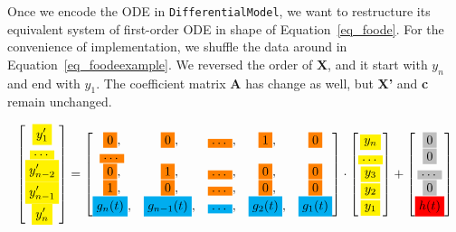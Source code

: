 Once we encode the ODE in \verb|DifferentialModel|, we want to restructure its equivalent system of first-order ODE in shape of Equation~\ref{eq_foode}. For the convenience of implementation, we shuffle the data around in Equation~\ref{eq_foodeexample}. We reversed the order of \textbf{X}, and it start with $y_{n}$ and end with $y_{1}$. The coefficient matrix \textbf{A} has change as well, but \textbf{X'} and \textbf{c} remain unchanged.



\begin{equation} \label{eq_foodeexamplecolor}
	\begin{bmatrix}
		\highlight{yellow}{y_{1}'} \\
    \highlight{yellow}{\dots} \\
    \highlight{yellow}{y_{n-2}'} \\
    \highlight{yellow}{y_{n-1}'} \\
    \highlight{yellow}{y_{n}'}
	\end{bmatrix}
    = 
  \begin{bmatrix}
		\highlight{orange}{0}, & \highlight{orange}{0}, & \highlight{orange}{\dots}, & \highlight{orange}{1}, & \highlight{orange}{0} \\
    \highlight{orange}{\dots} \\
    \highlight{orange}{0}, & \highlight{orange}{1}, & \highlight{orange}{\dots}, & \highlight{orange}{0}, & \highlight{orange}{0} \\
    \highlight{orange}{1}, & \highlight{orange}{0}, & \highlight{orange}{\dots}, & \highlight{orange}{0}, & \highlight{orange}{0} \\
    \highlight{cyan}{g_{n}(t)}, & \highlight{cyan}{g_{n-1}(t)}, & \highlight{cyan}{\dots}, & \highlight{cyan}{g_{2}(t)}, & \highlight{cyan}{g_{1}(t)}
	\end{bmatrix}
    \cdot
  \begin{bmatrix}
    \highlight{yellow}{y_{n}} \\
    \highlight{yellow}{\dots} \\
    \highlight{yellow}{y_{3}} \\
		\highlight{yellow}{y_{2}} \\
    \highlight{yellow}{y_{1}}
	\end{bmatrix}
    + 
  \begin{bmatrix}
    \highlight{lightgray}{0} \\
    \highlight{lightgray}{0} \\
    \highlight{lightgray}{\dots} \\
    \highlight{lightgray}{0} \\
    \highlight{red}{h(t)}
	\end{bmatrix}
\end{equation}

